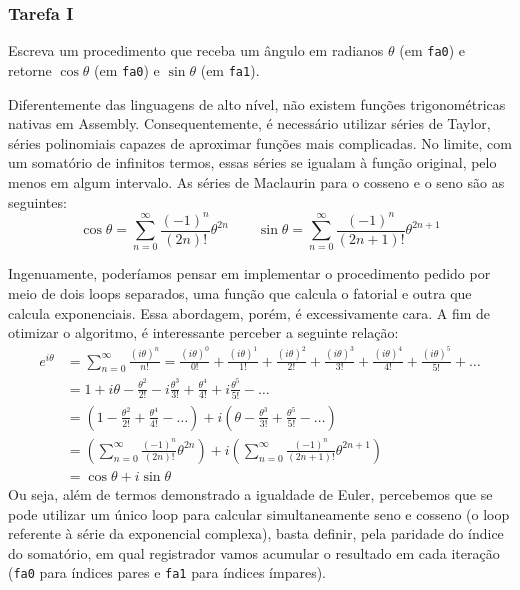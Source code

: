 \documentclass[a4paper,12pt]{article}
\newcommand{\cod}[1]{\texttt{#1}}
\begin{document}
\subsubsection{Tarefa I}

\begin{tcolorbox}[title=Enunciado, colback=blue!5!white, colframe=blue!75!black]
Escreva um procedimento que receba um ângulo em radianos $\theta$ (em \cod{fa0}) e retorne $\cos{\theta}$ (em \cod{fa0}) e $\sin{\theta}$ (em \cod{fa1}).
\end{tcolorbox}

Diferentemente das linguagens de alto nível, não existem funções trigonométricas nativas em Assembly. Consequentemente, é necessário utilizar séries de Taylor, séries polinomiais capazes de aproximar funções mais complicadas. No limite, com um somatório de infinitos termos, essas séries se igualam à função original, pelo menos em algum intervalo. As séries de Maclaurin para o cosseno e o seno são as seguintes:
\begin{equation*}
    \cos \theta = \sum_{n=0}^\infty \frac{(-1)^n}{(2n)!} \theta^{2n}  \quad \quad \sin \theta = \sum_{n=0}^\infty \frac{(-1)^n}{(2n+1)!} \theta^{2n+1}
\end{equation*}

Ingenuamente, poderíamos pensar em implementar o procedimento pedido por meio de dois loops separados, uma função que calcula o fatorial e outra que calcula exponenciais. Essa abordagem, porém, é excessivamente cara. A fim de otimizar o algoritmo, é interessante perceber a seguinte relação:
\begin{align*}
    e^{i\theta} &= \sum_{n=0}^\infty \frac{(i\theta)^n}{n!} = \frac{(i\theta)^0}{0!} + \frac{(i\theta)^1}{1!} + \frac{(i\theta)^2}{2!} + \frac{(i\theta)^3}{3!} + \frac{(i\theta)^4}{4!} + \frac{(i\theta)^5}{5!} + \dots\\
    &= 1 + i\theta - \frac{\theta^2}{2!} - i \frac{\theta^3}{3!} + \frac{\theta^4}{4!} + i\frac{\theta^5}{5!} - \dots \\
    &= \left(1 - \frac{\theta^2}{2!} + \frac{\theta^4}{4!} - \dots \right)
    + i \left(\theta - \frac{\theta^3}{3!} + \frac{\theta^5}{5!} - \dots \right) \\
    &= \left(\sum_{n=0}^\infty \frac{(-1)^n}{(2n)!} \theta^{2n}\right)
    + i \left(\sum_{n=0}^\infty \frac{(-1)^n}{(2n+1)!} \theta^{2n+1}\right) \\
    &= \cos{\theta} + i\sin{\theta}
\end{align*}
Ou seja, além de termos demonstrado a igualdade de Euler, percebemos que se pode utilizar um único loop para calcular simultaneamente seno e cosseno (o loop referente à série da exponencial complexa), basta definir, pela paridade do índice do somatório, em qual registrador vamos acumular o resultado em cada iteração (\cod{fa0} para índices pares e \cod{fa1} para índices ímpares).
\end{document}
